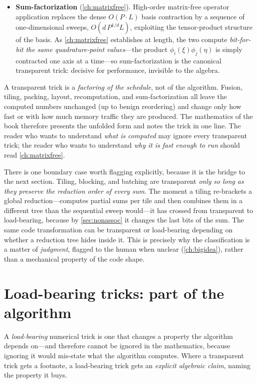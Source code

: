 \begin{itemize}[leftmargin=1.4em]
\item \textbf{Sum-factorization} (\cref{ch:matrixfree}). High-order matrix-free
  operator application replaces the dense $O(P\cdot L)$ basis contraction by a
  sequence of one-dimensional sweeps, $O(d\,P^{1/d}L)$, exploiting the
  tensor-product structure of the basis. As \cref{ch:matrixfree} establishes at
  length, the two compute \emph{bit-for-bit the same quadrature-point values}---the
  product $\phi_i(\xi)\phi_j(\eta)$ is simply contracted one axis at a time---so
  sum-factorization is the canonical transparent trick: decisive for performance,
  invisible to the algebra.
\end{itemize}

\begin{keyidea}
A transparent trick is a \emph{factoring of the schedule}, not of the algorithm.
Fusion, tiling, packing, layout, recomputation, and sum-factorization all leave the
computed numbers unchanged (up to benign reordering) and change only how fast or
with how much memory traffic they are produced. The mathematics of the book
therefore presents the unfolded form and notes the trick in one line. The reader
who wants to understand \emph{what is computed} may ignore every transparent trick;
the reader who wants to understand \emph{why it is fast enough to run} should read
\cref{ch:matrixfree}.
\end{keyidea}

There is one boundary case worth flagging explicitly, because it is the bridge to
the next section. Tiling, blocking, and batching are transparent \emph{only so long
as they preserve the reduction order of every sum}. The moment a tiling re-brackets
a global reduction---computes partial sums per tile and then combines them in a
different tree than the sequential sweep would---it has crossed from transparent to
load-bearing, because by \cref{sec:nonassoc} it changes the last bits of the sum.
The same code transformation can be transparent or load-bearing depending on
whether a reduction tree hides inside it. This is precisely why the classification
is a matter of \emph{judgment}, flagged to the human when unclear (\cref{ch:bigidea}),
rather than a mechanical property of the code shape.

\section{Load-bearing tricks: part of the algorithm}
\label{sec:loadbearing}

A \emph{load-bearing} numerical trick is one that changes a property the algorithm
depends on---and therefore cannot be ignored in the mathematics, because ignoring
it would mis-state what the algorithm computes. Where a transparent trick gets a
footnote, a load-bearing trick gets an \emph{explicit algebraic claim}, naming the
property it buys.

